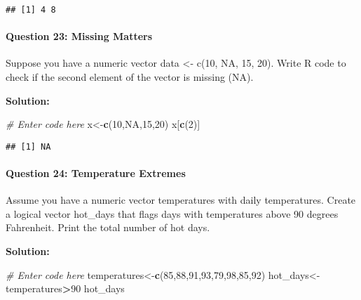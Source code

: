 \documentclass[
]{article}
\newenvironment{Shaded}{\begin{snugshade}}{\end{snugshade}}
\newcommand{\CommentTok}[1]{\textcolor[rgb]{0.56,0.35,0.01}{\textit{#1}}}
\newcommand{\ConstantTok}[1]{\textcolor[rgb]{0.56,0.35,0.01}{#1}}
\newcommand{\DecValTok}[1]{\textcolor[rgb]{0.00,0.00,0.81}{#1}}
\newcommand{\FunctionTok}[1]{\textcolor[rgb]{0.13,0.29,0.53}{\textbf{#1}}}
\newcommand{\NormalTok}[1]{#1}
\newcommand{\OtherTok}[1]{\textcolor[rgb]{0.56,0.35,0.01}{#1}}
\newcommand{\SpecialCharTok}[1]{\textcolor[rgb]{0.81,0.36,0.00}{\textbf{#1}}}
\begin{document}
\begin{verbatim}
## [1] 4 8
\end{verbatim}

\hypertarget{question-23-missing-matters}{%
\paragraph{Question 23: Missing
Matters}\label{question-23-missing-matters}}

Suppose you have a numeric vector data \textless- c(10, NA, 15, 20).
Write R code to check if the second element of the vector is missing
(NA).

\textbf{Solution:}

\begin{Shaded}
\begin{Highlighting}[]
\CommentTok{\# Enter code here}
\NormalTok{x}\OtherTok{\textless{}{-}}\FunctionTok{c}\NormalTok{(}\DecValTok{10}\NormalTok{,}\ConstantTok{NA}\NormalTok{,}\DecValTok{15}\NormalTok{,}\DecValTok{20}\NormalTok{)}
\NormalTok{x[}\FunctionTok{c}\NormalTok{(}\DecValTok{2}\NormalTok{)]}
\end{Highlighting}
\end{Shaded}

\begin{verbatim}
## [1] NA
\end{verbatim}

\hypertarget{question-24-temperature-extremes}{%
\paragraph{Question 24: Temperature
Extremes}\label{question-24-temperature-extremes}}

Assume you have a numeric vector temperatures with daily temperatures.
Create a logical vector hot\_days that flags days with temperatures
above 90 degrees Fahrenheit. Print the total number of hot days.

\textbf{Solution:}

\begin{Shaded}
\begin{Highlighting}[]
\CommentTok{\# Enter code here}
\NormalTok{temperatures}\OtherTok{\textless{}{-}}\FunctionTok{c}\NormalTok{(}\DecValTok{85}\NormalTok{,}\DecValTok{88}\NormalTok{,}\DecValTok{91}\NormalTok{,}\DecValTok{93}\NormalTok{,}\DecValTok{79}\NormalTok{,}\DecValTok{98}\NormalTok{,}\DecValTok{85}\NormalTok{,}\DecValTok{92}\NormalTok{)}
\NormalTok{hot\_days}\OtherTok{\textless{}{-}}\NormalTok{temperatures}\SpecialCharTok{\textgreater{}}\DecValTok{90}
\NormalTok{hot\_days}
\end{Highlighting}
\end{Shaded}
\end{document}
